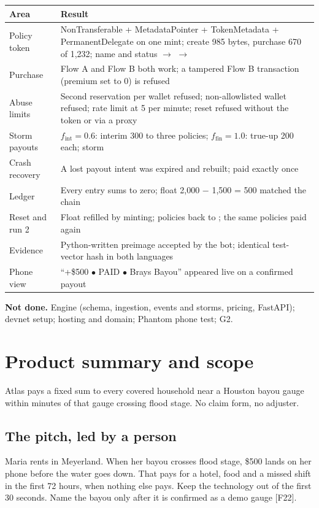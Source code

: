 \documentclass[11pt]{article}
\newcommand{\code}[1]{\texttt{\detokenize{#1}}}
\begin{document}
{\small
\begin{xltabular}{\linewidth}{@{}L{3.6cm} Y@{}}
\toprule
Area & Result \\
\midrule
Policy token & NonTransferable + MetadataPointer + TokenMetadata + PermanentDelegate on one mint; create 985 bytes, purchase 670 of 1,232; name and status \code{ACTV} $\rightarrow$ \code{PAID} $\rightarrow$ \code{ACTV} \\
Purchase & Flow A and Flow B both work; a tampered Flow B transaction (premium set to 0) is refused \\
Abuse limits & Second reservation per wallet refused; non-allowlisted wallet refused; rate limit at 5 per minute; reset refused without the token or via a proxy \\
Storm payouts & $f_\text{int}=0.6$: interim 300 to three policies; $f_\text{fin}=1.0$: true-up 200 each; storm \code{trued_up} \\
Crash recovery & A lost payout intent was expired and rebuilt; paid exactly once \\
Ledger & Every entry sums to zero; float 2,000 $-$ 1,500 = 500 matched the chain \\
Reset and run 2 & Float refilled by minting; policies back to \code{ACTV}; the same policies paid again \\
Evidence & Python-written preimage accepted by the bot; identical test-vector hash in both languages \\
Phone view & ``+\$500 $\bullet$ PAID $\bullet$ Brays Bayou'' appeared live on a confirmed payout \\
\bottomrule
\end{xltabular}
}

\textbf{Not done.} Engine (schema, ingestion, events and storms, pricing, FastAPI); devnet setup; hosting and domain; Phantom phone test; G2.

\section{Product summary and scope}

Atlas pays a fixed sum to every covered household near a Houston bayou gauge within minutes of that gauge crossing flood stage. No claim form, no adjuster.

\subsection{The pitch, led by a person}
Maria rents in Meyerland. When her bayou crosses flood stage, \$500 lands on her phone before the water goes down. That pays for a hotel, food and a missed shift in the first 72 hours, when nothing else pays. Keep the technology out of the first 30 seconds. Name the bayou only after it is confirmed as a demo gauge [F22].
\end{document}
